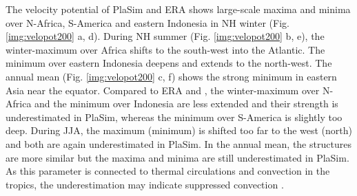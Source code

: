 \documentclass[12pt,a4paper,twoside,openright,headinclude,liststotoc,bibtotoc]{scrreprt}
\begin{document}
The velocity potential of PlaSim and ERA shows large-scale maxima and minima over N-Africa, S-America and eastern Indonesia in NH winter (Fig. \ref{img:velopot200} a, d). During NH summer (Fig. \ref{img:velopot200} b, e), the winter-maximum over Africa shifts to the south-west into the Atlantic. The minimum over eastern Indonesia deepens and extends to the north-west. The annual mean (Fig. \ref{img:velopot200} c, f) shows the strong minimum in eastern Asia near the equator. Compared to ERA and \citet{Gates1999}, the winter-maximum over N-Africa and the minimum over Indonesia are less extended and their strength is underestimated in PlaSim, whereas the minimum over S-America is slightly too deep. During JJA, the maximum (minimum) is shifted too far to the west (north) and both are again underestimated in PlaSim. In the annual mean, the structures are more similar but the maxima and minima are still underestimated in PlaSim. As this parameter is connected to thermal circulations and convection in the tropics, the underestimation may indicate suppressed convection \citep{Gates1999}. 
\end{document}
